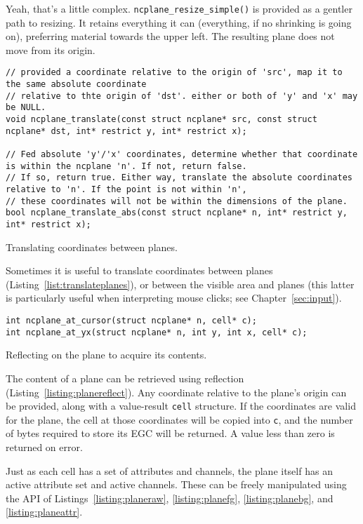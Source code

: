 Yeah, that's a little complex. \texttt{ncplane\_resize\_simple()} is provided
as a gentler path to resizing. It retains everything it can (everything, if no
shrinking is going on), preferring material towards the upper left. The resulting
plane does not move from its origin.
\begin{listing}[!htb]
\begin{verbatim}
// provided a coordinate relative to the origin of 'src', map it to the same absolute coordinate
// relative to thte origin of 'dst'. either or both of 'y' and 'x' may be NULL.
void ncplane_translate(const struct ncplane* src, const struct ncplane* dst, int* restrict y, int* restrict x);

// Fed absolute 'y'/'x' coordinates, determine whether that coordinate is within the ncplane 'n'. If not, return false.
// If so, return true. Either way, translate the absolute coordinates relative to 'n'. If the point is not within 'n',
// these coordinates will not be within the dimensions of the plane.
bool ncplane_translate_abs(const struct ncplane* n, int* restrict y, int* restrict x);
\end{verbatim}
\caption{Translating coordinates between planes.}
\label{list:translateplanes}
\end{listing}
Sometimes it is useful to translate coordinates between planes
(Listing~\ref{list:translateplanes}), or between the visible area and planes
(this latter is particularly useful when interpreting mouse clicks; see
Chapter~\ref{sec:input}).
\begin{listing}[!htb]
\begin{verbatim}
int ncplane_at_cursor(struct ncplane* n, cell* c);
int ncplane_at_yx(struct ncplane* n, int y, int x, cell* c);
\end{verbatim}
\caption{Reflecting on the plane to acquire its contents.}
\label{listing:planereflect}
\end{listing}
The content of a plane can be retrieved using reflection (Listing~\ref{listing:planereflect}).
Any coordinate relative to the plane's origin can be provided, along with a
value-result \texttt{cell} structure. If the coordinates are valid for the
plane, the cell at those coordinates will be copied into \texttt{c}, and the
number of bytes required to store its EGC will be returned. A value less than
zero is returned on error.


Just as each cell has a set of attributes and channels, the plane itself has
an active attribute set and active channels. These can be freely manipulated
using the API of Listings~\ref{listing:planeraw}, \ref{listing:planefg}, \ref{listing:planebg}, and
\ref{listing:planeattr}.

